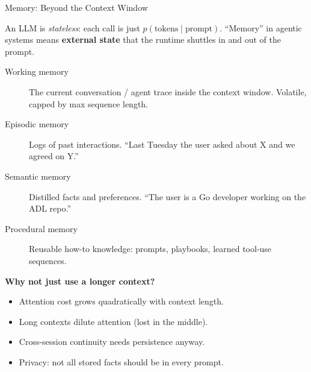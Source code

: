 \begin{frame}{Memory: Beyond the Context Window}

  An LLM is \emph{stateless}: each call is just $p(\text{tokens} \mid \text{prompt})$.
  ``Memory'' in agentic systems means \textbf{external state} that the runtime
  shuttles in and out of the prompt.

  \vspace{0.3em}
  \begin{description}
    \item[Working memory] The current conversation / agent trace inside the context window. Volatile, capped by max sequence length.
    \item[Episodic memory] Logs of past interactions. ``Last Tuesday the user asked about X and we agreed on Y.''
    \item[Semantic memory] Distilled facts and preferences. ``The user is a Go developer working on the ADL repo.''
    \item[Procedural memory] Reusable how-to knowledge: prompts, playbooks, learned tool-use sequences.
  \end{description}

  \vspace{0.4em}
  \textbf{Why not just use a longer context?}
  \begin{itemize}[nosep]
    \item Attention cost grows quadratically with context length.
    \item Long contexts dilute attention (lost in the middle).
    \item Cross-session continuity needs persistence anyway.
    \item Privacy: not all stored facts should be in every prompt.
  \end{itemize}
\end{frame}

